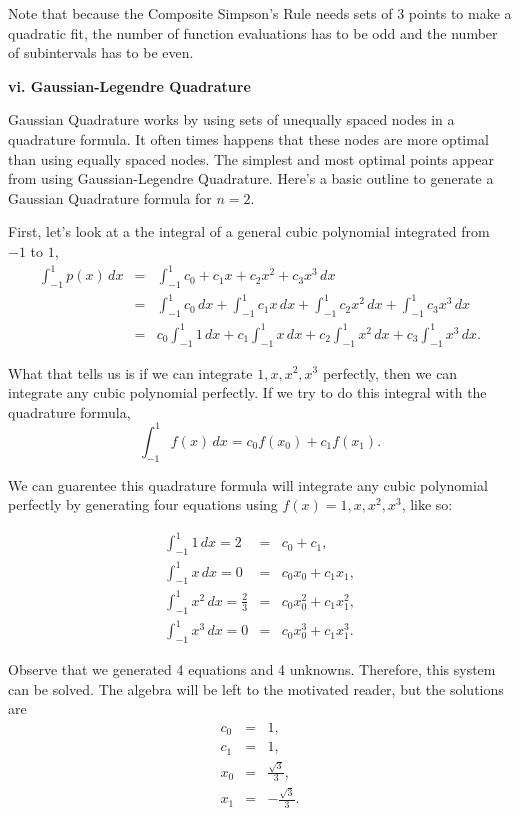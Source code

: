 \documentclass[12pt]{article}
\newcommand{\newLine}{\vspace{5mm}}
\newcommand{\nextsubsection}[1]{\newLine \noindent \large \textbf{#1} \normalsize}
\newcommand{\integral}[3]{\text{$\int^{#2}_{#1} #3\,dx$}}
\begin{document}
Note that because the Composite Simpson's Rule needs sets of 3 points to make a quadratic fit, the number of function evaluations has to be odd and the number of subintervals has to be even.

\nextsubsection{vi. Gaussian-Legendre Quadrature}

\newLine Gaussian Quadrature works by using sets of unequally spaced nodes in a quadrature formula. It often times happens that these nodes are more optimal than using equally spaced nodes. The simplest and most optimal points appear from using Gaussian-Legendre Quadrature. Here's a basic outline to generate a Gaussian Quadrature formula for $n=2$.

First, let's look at a the integral of a general cubic polynomial integrated from $-1$ to $1$,
\begin{eqnarray*} \integral{-1}{1}{p(x)} &=& \integral{-1}{1}{c_0 + c_1x + c_2x^2 + c_3x^3} \\
&=& \integral{-1}{1}{c_0} + \integral{-1}{1}{c_1x} + \integral{-1}{1}{c_2x^2} + \integral{-1}{1}{c_3x^3} \\
&=& c_0\integral{-1}{1}{1} + c_1\integral{-1}{1}{x} + c_2\integral{-1}{1}{x^2} + c_3\integral{-1}{1}{x^3}.
\end{eqnarray*}

What that tells us is if we can integrate $1,x,x^2,x^3$ perfectly, then we can integrate any cubic polynomial perfectly. If we try to do this integral with the quadrature formula,
\begin{equation*} \integral{-1}{1}{f(x)} = c_0f(x_0) + c_1f(x_1). \end{equation*}

We can guarentee this quadrature formula will integrate any cubic polynomial perfectly by generating four equations using $f(x)=1,x,x^2,x^3$, like so:

\begin{eqnarray*} \integral{-1}{1}{1} = 2 &=& c_0 + c_1, \\
\integral{-1}{1}{x} = 0 &=& c_0x_0 + c_1x_1, \\
\integral{-1}{1}{x^2} = \frac{2}{3} &=& c_0x_0^2 + c_1x_1^2, \\
\integral{-1}{1}{x^3} = 0 &=& c_0x_0^3 + c_1x_1^3.
\end{eqnarray*}

Observe that we generated 4 equations and 4 unknowns. Therefore, this system can be solved. The algebra will be left to the motivated reader, but the solutions are 
\begin{eqnarray*} c_0 &=& 1, \\
c_1 &=& 1, \\
x_0 &=& \frac{\sqrt{3}}{3}, \\
x_1 &=& -\frac{\sqrt{3}}{3}.
\end{eqnarray*}
\end{document}
